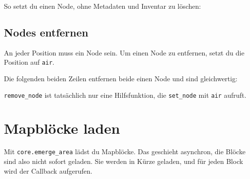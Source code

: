 So setzt du einen Node, ohne Metadaten und Inventar zu löschen:

\begin{Shaded}
\begin{Highlighting}[]
\OperatorTok{(}
    \OperatorTok{\{}  \OperatorTok{=} \OperatorTok{,}  \OperatorTok{=} \OperatorTok{,}  \OperatorTok{=}  \OperatorTok{\},}
    \OperatorTok{\{}  \OperatorTok{=}  \OperatorTok{\}}
\OperatorTok{)}
\end{Highlighting}
\end{Shaded}

\subsection{Nodes entfernen}\label{nodes-entfernen}

An jeder Position muss ein Node sein. Um einen Node zu entfernen, setzt
du die Position auf \texttt{air}.

Die folgenden beiden Zeilen entfernen beide einen Node und sind
gleichwertig:

\begin{Shaded}
\begin{Highlighting}[]
\OperatorTok{(}\OperatorTok{)}
\OperatorTok{(}\OperatorTok{,} \OperatorTok{\{}  \OperatorTok{=}  \OperatorTok{\})}
\end{Highlighting}
\end{Shaded}

\texttt{remove\_\allowbreak{}node} ist tatsächlich nur eine
Hilfsfunktion, die \texttt{set\_\allowbreak{}node} mit
\texttt{\textquotedbl{}air\textquotedbl{}} aufruft.

\section{Mapblöcke laden}\label{mapbluxf6cke-laden}

Mit
\texttt{core.\allowbreak{}emerge\_\allowbreak{}area}
lädst du Mapblöcke. Das geschieht asynchron, die Blöcke sind also nicht
sofort geladen. Sie werden in Kürze geladen, und für jeden Block wird
der Callback aufgerufen.

